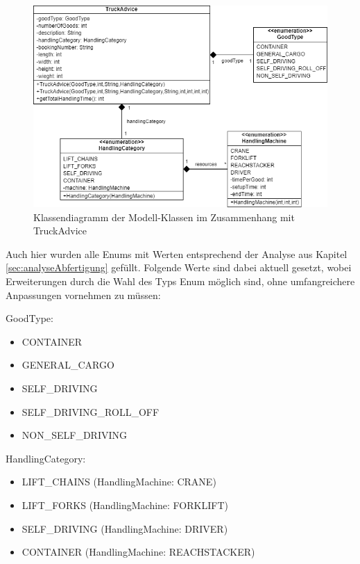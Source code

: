 \begin{figure}[H]
    \centering
    \includegraphics[width=\textwidth]{images/classDiagrams/TSP_TruckAdvice_ClassDiagram.png}
    \caption{Klassendiagramm der Modell-Klassen im Zusammenhang mit TruckAdvice}
    \label{fig:tspClassDiagramTruckAvice}
\end{figure}


Auch hier wurden alle Enums mit Werten entsprechend der Analyse aus Kapitel \ref{sec:analyseAbfertigung} gefüllt. Folgende Werte sind dabei aktuell gesetzt, wobei Erweiterungen durch die Wahl des Typs Enum möglich sind, ohne umfangreichere Anpassungen vornehmen zu müssen: 

GoodType:
\begin{itemize}
    \item CONTAINER
    \item GENERAL\_CARGO
    \item SELF\_DRIVING
    \item SELF\_DRIVING\_ROLL\_OFF
    \item NON\_SELF\_DRIVING
\end{itemize}

HandlingCategory:
\begin{itemize}
    \item LIFT\_CHAINS (HandlingMachine: CRANE)
    \item LIFT\_FORKS (HandlingMachine: FORKLIFT)
    \item SELF\_DRIVING (HandlingMachine: DRIVER)
    \item CONTAINER (HandlingMachine: REACHSTACKER)
\end{itemize}

